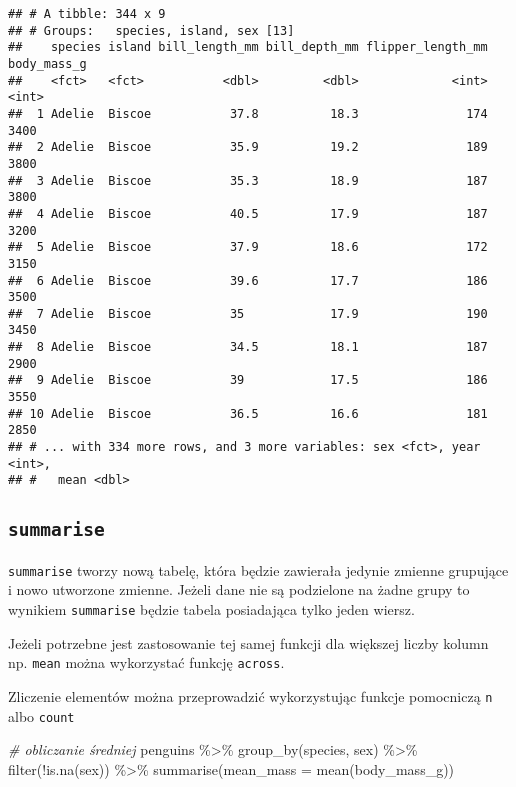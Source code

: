 \documentclass[
]{book}
\newenvironment{Shaded}{\begin{snugshade}}{\end{snugshade}}
\newcommand{\AttributeTok}[1]{\textcolor[rgb]{0.77,0.63,0.00}{#1}}
\newcommand{\CommentTok}[1]{\textcolor[rgb]{0.56,0.35,0.01}{\textit{#1}}}
\newcommand{\FunctionTok}[1]{\textcolor[rgb]{0.00,0.00,0.00}{#1}}
\newcommand{\NormalTok}[1]{#1}
\newcommand{\SpecialCharTok}[1]{\textcolor[rgb]{0.00,0.00,0.00}{#1}}
\begin{document}
\begin{verbatim}
## # A tibble: 344 x 9
## # Groups:   species, island, sex [13]
##    species island bill_length_mm bill_depth_mm flipper_length_mm body_mass_g
##    <fct>   <fct>           <dbl>         <dbl>             <int>       <int>
##  1 Adelie  Biscoe           37.8          18.3               174        3400
##  2 Adelie  Biscoe           35.9          19.2               189        3800
##  3 Adelie  Biscoe           35.3          18.9               187        3800
##  4 Adelie  Biscoe           40.5          17.9               187        3200
##  5 Adelie  Biscoe           37.9          18.6               172        3150
##  6 Adelie  Biscoe           39.6          17.7               186        3500
##  7 Adelie  Biscoe           35            17.9               190        3450
##  8 Adelie  Biscoe           34.5          18.1               187        2900
##  9 Adelie  Biscoe           39            17.5               186        3550
## 10 Adelie  Biscoe           36.5          16.6               181        2850
## # ... with 334 more rows, and 3 more variables: sex <fct>, year <int>,
## #   mean <dbl>
\end{verbatim}

\hypertarget{summarise}{%
\subsection{\texorpdfstring{\texttt{summarise}}{summarise}}\label{summarise}}

\texttt{summarise} tworzy nową tabelę, która będzie zawierała jedynie zmienne grupujące i nowo utworzone zmienne. Jeżeli dane nie są podzielone na żadne grupy to wynikiem \texttt{summarise} będzie tabela posiadająca tylko jeden wiersz.

Jeżeli potrzebne jest zastosowanie tej samej funkcji dla większej liczby kolumn np. \texttt{mean} można wykorzystać funkcję \texttt{across}.

Zliczenie elementów można przeprowadzić wykorzystując funkcje pomocniczą \texttt{n} albo \texttt{count}

\begin{Shaded}
\begin{Highlighting}[]
\CommentTok{\# obliczanie średniej}
\NormalTok{penguins }\SpecialCharTok{\%\textgreater{}\%} \FunctionTok{group\_by}\NormalTok{(species, sex) }\SpecialCharTok{\%\textgreater{}\%} \FunctionTok{filter}\NormalTok{(}\SpecialCharTok{!}\FunctionTok{is.na}\NormalTok{(sex)) }\SpecialCharTok{\%\textgreater{}\%}
  \FunctionTok{summarise}\NormalTok{(}\AttributeTok{mean\_mass =} \FunctionTok{mean}\NormalTok{(body\_mass\_g))}
\end{Highlighting}
\end{Shaded}
\end{document}
